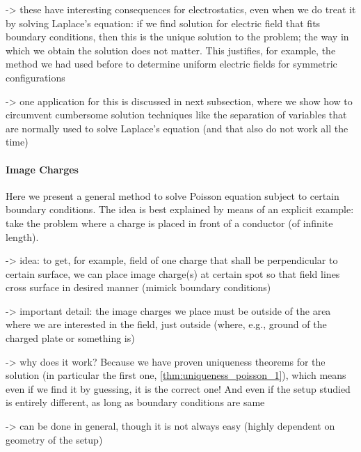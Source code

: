 \documentclass[../class_mech_main.tex]{subfiles}
\begin{document}
-> these have interesting consequences for electrostatics, even when we do treat it by solving Laplace's equation: if we find solution for electric field that fits boundary conditions, then this is the unique solution to the problem; the way in which we obtain the solution does not matter. This justifies, for example, the method we had used before to determine uniform electric fields for symmetric configurations

-> one application for this is discussed in next subsection, where we show how to circumvent cumbersome solution techniques like the separation of variables that are normally used to solve Laplace's equation (and that also do not work all the time)



            \paragraph{Image Charges}
Here we present a general method to solve Poisson equation subject to certain boundary conditions. The idea is best explained by means of an explicit example: take the problem where a charge is placed in front of a conductor (of infinite length). 

-> idea: to get, for example, field of one charge that shall be perpendicular to certain surface, we can place image charge(s) at certain spot so that field lines cross surface in desired manner (mimick boundary conditions)

-> important detail: the image charges we place must be outside of the area where we are interested in the field, just outside (where, e.g., ground of the charged plate or something is)

-> why does it work? Because we have proven uniqueness theorems for the solution (in particular the first one, \ref{thm:uniqueness_poisson_1}), which means even if we find it by guessing, it is the correct one! And even if the setup studied is entirely different, as long as boundary conditions are same

-> can be done in general, though it is not always easy (highly dependent on geometry of the setup)

\end{document}
